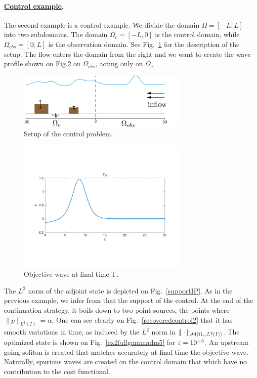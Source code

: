 \paragraph{\underline{Control example}.}
The second example is a control example. We divide the domain $\Omega = [-L,L]$ into two subdomains. The domain $\Omega_c = [-L,0]$ is the control domain, while $\Omega_{obs} = [0,L]$ is the observation domain. See Fig.~\ref{controlsetup} for the description of the setup. The flow enters the domain from the right and we want to create the wave profile shown on Fig.\ref{objectivewave} on $\Omega_{obs}$, acting only on $\Omega_c$.
\begin{figure}[!h]
\includegraphics[width = 0.75\textwidth]{images/control_setup.png}
\caption{Setup of the control problem.}
\label{controlsetup}
\end{figure}
\begin{figure}[!h]
\includegraphics[width = 0.75\textwidth]{images/ex2yd.pdf}
\caption{Objective wave at final time T.}
\label{objectivewave}
\end{figure}
The $L^2$ norm of the adjoint state is depicted on Fig.~\ref{supportIP}. As in the previous example, we infer from that the support of the control. At the end of the continuation strategy, it boils down to two point sources, the points where $\|p\|_{L^2(I)} = \alpha$. One can see clearly on Fig.~\ref{recoveredcontrol2} that it has smooth variations in time, as induced by the $L^2$ norm in $\|\cdot\|_{\mathcal{M}(\Omega_c, L^{2}(I))}$. The optimized state is shown on Fig.~\ref{ex2fullgammadm5} for $\varepsilon = 10^{-5}$. An upstream going soliton is created that matches accurately at final time the objective wave. Naturally, spurious waves are created on the control domain that which have no contribution to the cost functional.
